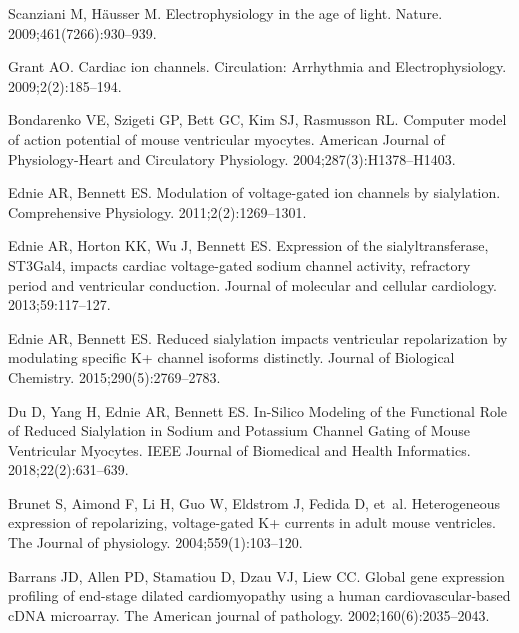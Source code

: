 \documentclass[10pt,letterpaper]{article}
\begin{document}
\begin{thebibliography}{10}
    Scanziani M, H{\"a}usser M.
    \newblock Electrophysiology in the age of light.
    \newblock Nature. 2009;461(7266):930--939.
    
    Grant AO.
    \newblock Cardiac ion channels.
    \newblock Circulation: Arrhythmia and Electrophysiology. 2009;2(2):185--194.
    
    Bondarenko VE, Szigeti GP, Bett GC, Kim SJ, Rasmusson RL.
    \newblock Computer model of action potential of mouse ventricular myocytes.
    \newblock American Journal of Physiology-Heart and Circulatory Physiology.
    2004;287(3):H1378--H1403.
    
    Ednie AR, Bennett ES.
    \newblock Modulation of voltage-gated ion channels by sialylation.
    \newblock Comprehensive Physiology. 2011;2(2):1269--1301.
    
    Ednie AR, Horton KK, Wu J, Bennett ES.
    \newblock Expression of the sialyltransferase, ST3Gal4, impacts cardiac
    voltage-gated sodium channel activity, refractory period and ventricular
    conduction.
    \newblock Journal of molecular and cellular cardiology. 2013;59:117--127.
    
    Ednie AR, Bennett ES.
    \newblock Reduced sialylation impacts ventricular repolarization by modulating
    specific K+ channel isoforms distinctly.
    \newblock Journal of Biological Chemistry. 2015;290(5):2769--2783.
    
    {Du} D, {Yang} H, {Ednie} AR, {Bennett} ES.
    \newblock In-Silico Modeling of the Functional Role of Reduced Sialylation in
    Sodium and Potassium Channel Gating of Mouse Ventricular Myocytes.
    \newblock IEEE Journal of Biomedical and Health Informatics.
    2018;22(2):631--639.
    
    Brunet S, Aimond F, Li H, Guo W, Eldstrom J, Fedida D, et~al.
    \newblock Heterogeneous expression of repolarizing, voltage-gated K+ currents
    in adult mouse ventricles.
    \newblock The Journal of physiology. 2004;559(1):103--120.
    
    Barrans JD, Allen PD, Stamatiou D, Dzau VJ, Liew CC.
    \newblock Global gene expression profiling of end-stage dilated cardiomyopathy
    using a human cardiovascular-based cDNA microarray.
    \newblock The American journal of pathology. 2002;160(6):2035--2043.
    

\end{thebibliography}
\end{document}
